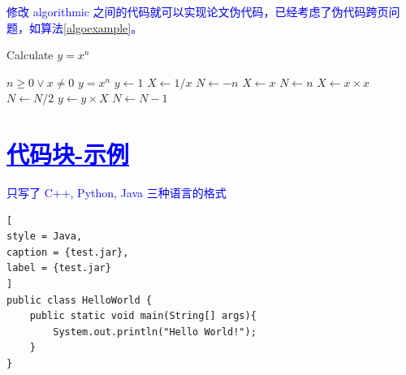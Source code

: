 \textcolor{blue}{修改 algorithmic 之间的代码就可以实现论文伪代码，已经考虑了伪代码跨页问题，如算法\ref{algoexample}。}
\begin{breakablealgorithm}
        \caption{Calculate $y = x^n$}
        \label{algoexample}
        \begin{algorithmic}[1] %
            \Require $n \geq 0 \vee x \neq 0$ 
            \Ensure  $y = x^n$
            \State $y \gets 1$
            \State $ X \gets 1 / x$
            \State $N \gets -n$
            \Else
            \State $X \gets x$
            \State $N \gets n$
            \EndIf
            \State $X \gets x \times x$
            \State $N \gets N / 2$
            \Else[$N$ is odd]
            \State $y \gets y \times X$
            \State $N \gets N - 1$
            \EndIf
            \EndWhile
     \end{algorithmic}
    \end{breakablealgorithm}

\section{\textcolor{blue}{\underline{\underline{代码块-示例}}}}
\textcolor{blue}{只写了 C++, Python, Java 三种语言的格式}



\begin{lstlisting}[
style = Java,
caption = {test.jar},
label = {test.jar}
]
public class HelloWorld {
    public static void main(String[] args){
        System.out.println("Hello World!");
    }
}
\end{lstlisting}



